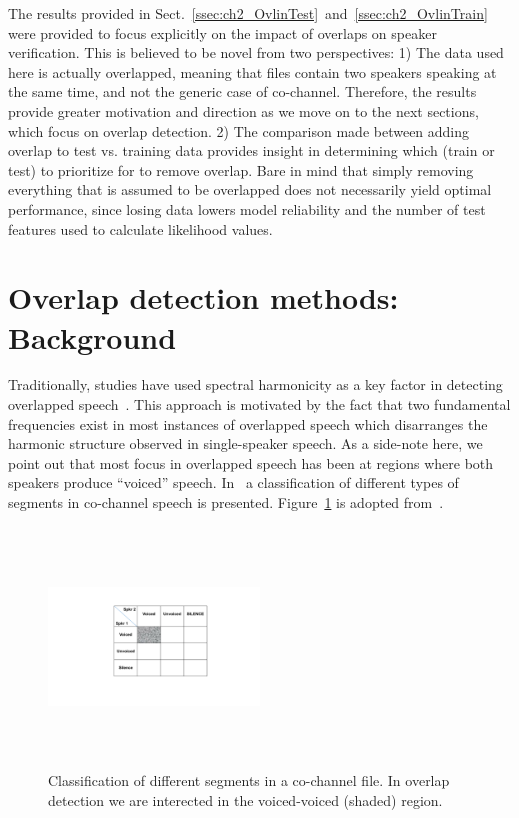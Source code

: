 The results provided in Sect.~\ref{ssec:ch2_OvlinTest}~and~\ref{ssec:ch2_OvlinTrain} were provided to focus explicitly on the impact of overlaps on speaker verification. 
This is believed to be novel from two perspectives: 
1) The data used here is actually overlapped, meaning that files contain two speakers speaking at the same time, and not the generic case of co-channel. Therefore, the results provide greater motivation and direction as we move on to the next sections, which focus on overlap detection. 
2) The comparison made between adding overlap to test vs. training data provides insight in determining which (train or test) to prioritize for to remove overlap. Bare in mind that simply removing everything that is assumed to be overlapped does not necessarily yield optimal performance, since losing data lowers model reliability and the number of test features used to calculate likelihood values. 

\newpage
\section{Overlap detection methods: Background}
\label{sec:ch2_methods}

Traditionally, studies have used spectral harmonicity as a key factor in detecting overlapped speech~\cite{nav_icassp13,smolenski_tut}. 
This approach is motivated by the fact that two fundamental frequencies exist in most instances of overlapped speech which disarranges the harmonic structure observed in single-speaker speech. 
As a side-note here, we point out that most focus in overlapped speech has been at regions where both speakers produce ``voiced'' speech. In~\cite{morgan_cochannel} a classification of different types of segments in co-channel speech is presented. Figure~\ref{fig:morgan_v_uv_table} is adopted from~\cite{morgan_cochannel}. 

\begin{figure}[h!]
	\centering
	\includegraphics[height = 2.5in, width=0.5\textwidth]{figures/morgan_v_uv_table}
	\caption{Classification of different segments in a co-channel file. In overlap detection we are interected in 
		the voiced-voiced (shaded) region.}
	\label{fig:morgan_v_uv_table}
\end{figure}

